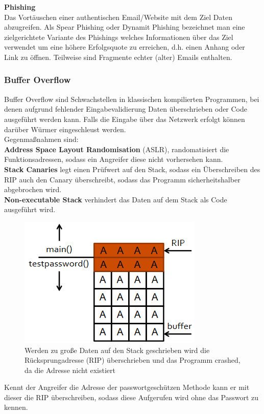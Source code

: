 \documentclass[a4paper,12pt,leqno]{article}
\begin{document}
\textbf{Phishing}\\
Das Vortäuschen einer authentischen Email/Website mit dem Ziel Daten abzugreifen.
Als Spear Phishing oder Dynamit Phishing bezeichnet man eine zielgerichtete Variante des Phishings welches Informationen über das Ziel verwendet um eine höhere Erfolgsquote zu erreichen, d.h. einen Anhang oder Link zu öffnen. Teilweise sind Fragmente echter (alter) Emails enthalten.

\subsubsection{Buffer Overflow}

Buffer Overflow sind Schwachstellen in klassischen kompilierten Programmen, bei denen aufgrund fehlender Eingabevalidierung Daten überschrieben oder Code ausgeführt werden kann.
Falls die Eingabe über das Netzwerk erfolgt können darüber Würmer eingeschleust werden.\\

Gegenmaßnahmen sind:\\
\textbf{Address Space Layout Randomisation} (ASLR), randomatisiert die Funktionsadressen, sodass ein Angreifer diese nicht vorhersehen kann.\\
\textbf{Stack Canaries} legt einen Prüfwert auf den Stack, sodass ein Überschreiben des RIP auch den Canary überschreibt, sodass das Programm sicherheitshalber abgebrochen wird.\\
\textbf{Non-executable Stack} verhindert das Daten auf dem Stack als Code ausgeführt wird.\\

\begin{figure}[h!]
\centering
\includegraphics[scale=0.8]{Grafiken/StackSmashing.png}
\caption{Werden zu große Daten auf den Stack geschrieben wird die Rücksprungadresse (RIP) überschrieben und das Programm crashed, da die Adresse nicht existiert}
\end{figure}
Kennt der Angreifer die Adresse der passwortgeschützen Methode kann er mit dieser die RIP überschreiben, sodass diese Aufgerufen wird ohne das Passwort zu kennen.
\end{document}
